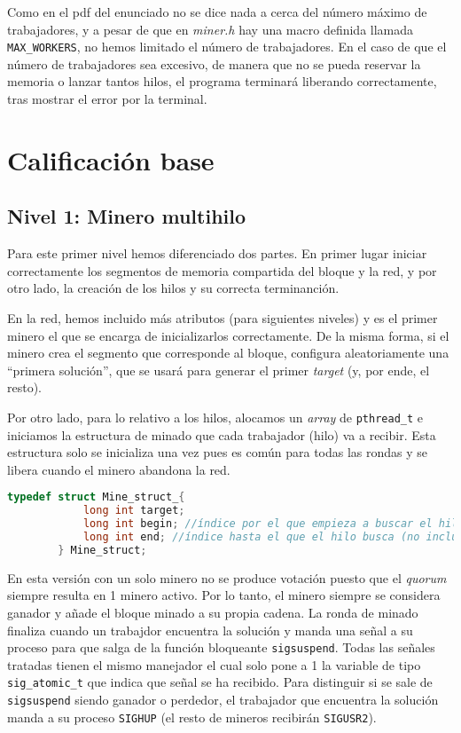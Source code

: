 \documentclass{article}
\begin{document}
Como en el pdf del enunciado no se dice nada a cerca del número máximo de trabajadores, y a pesar de que en \emph{miner.h} hay una macro definida llamada \texttt{MAX\_WORKERS}, no hemos limitado el número de trabajadores. En el caso de que el número de trabajadores sea excesivo, de manera que no se pueda reservar la memoria o lanzar tantos hilos, el programa terminará liberando correctamente, tras mostrar el error por la terminal.


\section*{Calificación base}

\subsection*{Nivel 1: Minero multihilo}

    Para este primer nivel hemos diferenciado dos partes. En primer lugar iniciar correctamente los segmentos de memoria compartida del bloque y la red, y por otro lado, la creación de los hilos y su correcta terminanción. 

    En la red, hemos incluido más atributos (para siguientes niveles) y es el primer minero el que se encarga de inicializarlos correctamente.
    De la misma forma, si el minero crea el segmento que corresponde al bloque, configura aleatoriamente una ``primera solución'', que se usará para generar el primer \textit{target} (y, por ende, el resto).

    Por otro lado, para lo relativo a los hilos, alocamos un \textit{array} de \texttt{pthread\_t} e iniciamos la estructura de minado que cada trabajador (hilo) va a recibir. Esta estructura solo se inicializa una vez pues es común para todas las rondas y se libera cuando el minero abandona la red. 
    
    \begin{lstlisting}[language=C, texcl=true]
        typedef struct Mine_struct_{
            long int target;
            long int begin; //índice por el que empieza a buscar el hilo
            long int end; //índice hasta el que el hilo busca (no incluido)
        } Mine_struct;  \end{lstlisting}


    En esta versión con un solo minero no se produce votación puesto que el \textit{quorum} siempre resulta en 1 minero activo. Por lo tanto, el minero siempre se considera ganador y añade el bloque minado a su propia cadena. La ronda de minado finaliza cuando un trabajdor encuentra la solución y manda una señal a su proceso para que salga de la función bloqueante \texttt{sigsuspend}. Todas las señales tratadas tienen el mismo manejador el cual solo pone a 1 la variable de tipo \texttt{sig\_atomic\_t} que indica que señal se ha recibido. Para distinguir si se sale de \texttt{sigsuspend} siendo ganador o perdedor, el trabajador que encuentra la solución manda a su proceso \texttt{SIGHUP} (el resto de mineros recibirán \texttt{SIGUSR2}).
\end{document}
